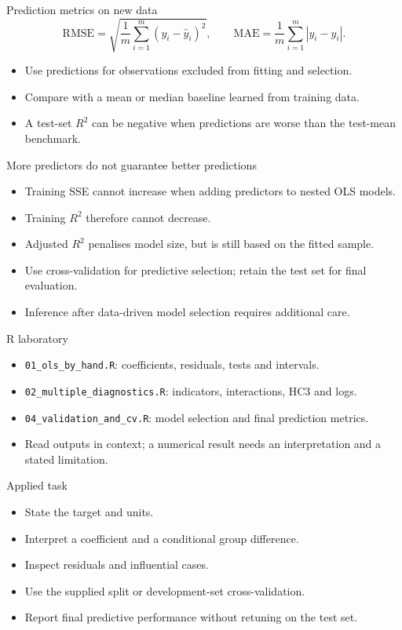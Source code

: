 \begin{frame}{Prediction metrics on new data}
\[\mathrm{RMSE}=\sqrt{\frac1m\sum_{i=1}^m(y_i-\hat y_i)^2},\qquad\mathrm{MAE}=\frac1m\sum_{i=1}^m|y_i-\hat y_i|.\]\begin{itemize}
\item Use predictions for observations excluded from fitting and selection.
\item Compare with a mean or median baseline learned from training data.
\item A test-set $R^2$ can be negative when predictions are worse than the test-mean benchmark.
\end{itemize}
\end{frame}

\begin{frame}{More predictors do not guarantee better predictions}
\begin{itemize}
\item Training SSE cannot increase when adding predictors to nested OLS models.
\item Training $R^2$ therefore cannot decrease.
\item Adjusted $R^2$ penalises model size, but is still based on the fitted sample.
\item Use cross-validation for predictive selection; retain the test set for final evaluation.
\item Inference after data-driven model selection requires additional care.
\end{itemize}
\end{frame}

\begin{frame}{R laboratory}
\begin{itemize}
\item \texttt{01\_ols\_by\_hand.R}: coefficients, residuals, tests and intervals.
\item \texttt{02\_multiple\_diagnostics.R}: indicators, interactions, HC3 and logs.
\item \texttt{04\_validation\_and\_cv.R}: model selection and final prediction metrics.
\item Read outputs in context; a numerical result needs an interpretation and a stated limitation.
\end{itemize}
\end{frame}

\begin{frame}{Applied task}
\begin{itemize}
\item State the target and units.
\item Interpret a coefficient and a conditional group difference.
\item Inspect residuals and influential cases.
\item Use the supplied split or development-set cross-validation.
\item Report final predictive performance without retuning on the test set.
\end{itemize}
\end{frame}

